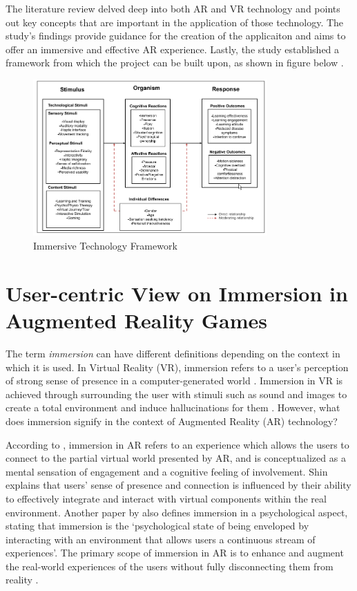 The literature review delved deep into both AR and VR technology and points out key concepts that are important in the application of those technology. The study's findings provide guidance for the creation of the applicaiton and aims to offer an immersive and effective AR experience. Lastly, the study established a framework from which the project can be built upon, as shown in figure below \cite{suh2018}.

\begin{figure}[h]
    \centering
    \includegraphics[width=0.8\textwidth]{figures/ImmersiveFramework.png}
    \caption{Immersive Technology Framework}
\end{figure}

\section{User-centric View on Immersion in Augmented Reality Games}

The term \textit{immersion} can have different definitions depending on the context in which it is used. In Virtual Reality (VR), immersion refers to a user's perception of strong sense of presence in a computer-generated world \cite{immersionAR}. Immersion in VR is achieved through surrounding the user with stimuli such as sound and images to create a total environment and induce hallucinations for them \cite{immersionAR}. However, what does immersion signify in the context of Augmented Reality (AR) technology? 

According to \cite{immersionAR}, immersion in AR refers to an experience which allows the users to connect to the partial virtual world presented by AR, and is conceptualized as a mental sensation of engagement and a cognitive feeling of involvement. Shin explains that users' sense of presence and connection is influenced by their ability to effectively integrate and interact with virtual components within the real environment. Another paper by \cite{KIM201379} also defines immersion in a psychological aspect, stating that immersion is the ‘psychological state of being enveloped by interacting with an environment that allows users a continuous stream of experiences’. The primary scope of immersion in AR is to enhance and augment the real-world experiences of the users without fully disconnecting them from reality \cite{midles2024}.

